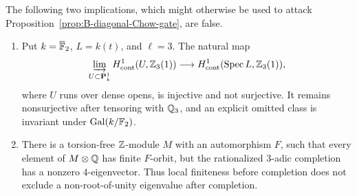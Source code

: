 \begin{proposition}
\label{prop:B-limit-diagnostics}
The following two implications, which might otherwise be used to attack
Proposition~\ref{prop:B-diagonal-Chow-gate}, are false.
\begin{enumerate}
\item Put \(k=\overline{\mathbb F}_2\), \(L=k(t)\), and \(\ell=3\).
The natural map
\[
 \varinjlim_{U\subset\mathbf P^1_k}
 H^1_{\mathrm{cont}}(U,\mathbb Z_3(1))
 \longrightarrow H^1_{\mathrm{cont}}(\operatorname{Spec} L,\mathbb Z_3(1)),
\]
where \(U\) runs over dense opens, is injective and not surjective.
It remains nonsurjective after tensoring with \(\mathbb Q_3\), and an
explicit omitted class is invariant under \(\operatorname{Gal}(k/\mathbb F_2)\).
\item There is a torsion-free \(\mathbb Z\)-module \(M\) with an automorphism
\(F\), such that every element of \(M\otimes\mathbb Q\) has finite
\(F\)-orbit, but the rationalized \(3\)-adic completion has a nonzero
\(4\)-eigenvector.  Thus local finiteness before completion does not
exclude a non-root-of-unity eigenvalue after completion.
\end{enumerate}
\end{proposition}
